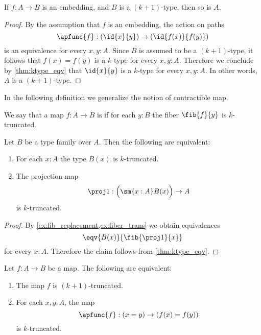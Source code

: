 \begin{cor}\label{cor:emb_into_ktype}
If $f:A\to B$ is an embedding, and $B$ is a $(k+1)$-type, then so is $A$.
\end{cor}

\begin{proof}
By the assumption that $f$ is an embedding, the action on paths
\begin{equation*}
\apfunc{f}:(\id{x}{y})\to (\id{f(x)}{f(y)})
\end{equation*}
is an equivalence for every $x,y:A$. Since $B$ is assumed to be a $(k+1)$-type, it follows that $f(x)=f(y)$ is a $k$-type for every $x,y:A$. Therefore we conclude by \cref{thm:ktype_eqv} that $\id{x}{y}$ is a $k$-type for every $x,y:A$. In other words, $A$ is a $(k+1)$-type.
\end{proof}

In the following definition we generalize the notion of contractible map.

\begin{defn}
We say that a map $f:A\to B$ is  if for each $y:B$ the fiber $\fib{f}{y}$ is $k$-truncated.
\end{defn}

\begin{thm}
Let $B$ be a type family over $A$. Then the following are equivalent:
\begin{enumerate}
\item For each $x:A$ the type $B(x)$ is $k$-truncated.
\item The projection map
\begin{equation*}
\proj 1 : \Big(\sm{x:A}B(x)\Big)\to A
\end{equation*}
is $k$-truncated.
\end{enumerate}
\end{thm}

\begin{proof}
By \cref{ex:fib_replacement,ex:fiber_trans} we obtain equivalences
\begin{equation*}
\eqv{B(x)}{\fib{\proj 1}{x}}
\end{equation*}
for every $x:A$. Therefore the claim follows from \cref{thm:ktype_eqv}.
\end{proof}

\begin{thm}\label{thm:trunc_ap}
Let $f:A\to B$ be a map. The following are equivalent:
\begin{enumerate}
\item The map $f$ is $(k+1)$-truncated.
\item For each $x,y:A$, the map
\begin{equation*}
\apfunc{f} : (x=y)\to (f(x)=f(y))
\end{equation*}
is $k$-truncated. 
\end{enumerate}
\end{thm}

